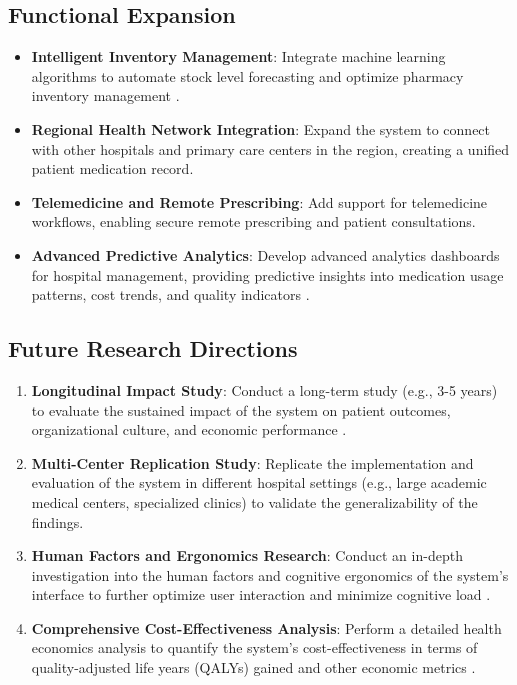 \subsection{Functional Expansion}

\begin{itemize}
    \item \textbf{Intelligent Inventory Management}: Integrate machine learning algorithms to automate stock level forecasting and optimize pharmacy inventory management \cite{rozenblum2020}.
    \item \textbf{Regional Health Network Integration}: Expand the system to connect with other hospitals and primary care centers in the region, creating a unified patient medication record.
    \item \textbf{Telemedicine and Remote Prescribing}: Add support for telemedicine workflows, enabling secure remote prescribing and patient consultations.
    \item \textbf{Advanced Predictive Analytics}: Develop advanced analytics dashboards for hospital management, providing predictive insights into medication usage patterns, cost trends, and quality indicators \cite{berwick2008}.
\end{itemize}

\subsection{Future Research Directions}

\begin{enumerate}
    \item \textbf{Longitudinal Impact Study}: Conduct a long-term study (e.g., 3-5 years) to evaluate the sustained impact of the system on patient outcomes, organizational culture, and economic performance \cite{greenhalgh2017}.
    \item \textbf{Multi-Center Replication Study}: Replicate the implementation and evaluation of the system in different hospital settings (e.g., large academic medical centers, specialized clinics) to validate the generalizability of the findings.
    \item \textbf{Human Factors and Ergonomics Research}: Conduct an in-depth investigation into the human factors and cognitive ergonomics of the system's interface to further optimize user interaction and minimize cognitive load \cite{holden2011}.
    \item \textbf{Comprehensive Cost-Effectiveness Analysis}: Perform a detailed health economics analysis to quantify the system's cost-effectiveness in terms of quality-adjusted life years (QALYs) gained and other economic metrics \cite{adler2021}.
\end{enumerate}

